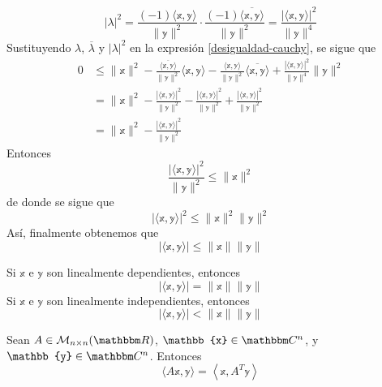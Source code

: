 \begin{theorem}
    $$|\lambda|^2 = \frac{(-1)\langle \mathbb{x}, \mathbb{y} \rangle}{\| \mathbb{y} \|^2} \cdot \frac{(-1)\overline{\langle \mathbb{x}, \mathbb{y} \rangle}}{\| \mathbb{y} \|^2} = \frac{|\langle \mathbb{x}, \mathbb{y} \rangle|^2}{\| \mathbb{y} \|^4}$$
    Sustituyendo $\lambda$, $\overline{\lambda}$ y $|\lambda|^2$ en la expresión \eqref{desigualdad-cauchy}, se sigue que
    \begin{align*}
        0 & \leq \| \mathbb{x} \|^2 - \frac{\overline{\langle \mathbb{x}, \mathbb{y} \rangle}}{\| \mathbb{y} \|^2} \langle \mathbb{x}, \mathbb{y} \rangle - \frac{\langle \mathbb{x}, \mathbb{y} \rangle}{\| \mathbb{y} \|^2} \overline{\langle \mathbb{x}, \mathbb{y} \rangle} + \frac{|\langle \mathbb{x}, \mathbb{y} \rangle|^2}{\| \mathbb{y} \|^4} \| \mathbb{y} \|^2 \\
        & = \| \mathbb{x} \|^2 - \frac{|\langle \mathbb{x}, \mathbb{y} \rangle|^2}{\| \mathbb{y} \|^2} - \frac{|\langle \mathbb{x}, \mathbb{y} \rangle|^2}{\| \mathbb{y} \|^2} + \frac{|\langle \mathbb{x}, \mathbb{y} \rangle|^2}{\| \mathbb{y} \|^2} \\
        & = \| \mathbb{x} \|^2 - \frac{|\langle \mathbb{x}, \mathbb{y} \rangle|^2}{\| \mathbb{y} \|^2}
    \end{align*}
    Entonces
    $$\frac{|\langle \mathbb{x}, \mathbb{y} \rangle|^2}{\| \mathbb{y} \|^2} \leq \| \mathbb{x} \|^2$$
    de donde se sigue que
    $$|\langle \mathbb{x}, \mathbb{y} \rangle|^2 \leq \| \mathbb{x} \|^2 \| \mathbb{y} \|^2$$
    Así, finalmente obtenemos que
    $$|\langle \mathbb{x}, \mathbb{y} \rangle| \leq \| \mathbb{x} \| \| \mathbb{y} \|$$
\end{theorem}

\begin{observation}
    Si $\mathbb{x}$ e $\mathbb{y}$ son linealmente dependientes, entonces
    $$|\langle \mathbb{x}, \mathbb{y} \rangle| = \| \mathbb{x} \| \| \mathbb{y} \|$$
    Si $\mathbb{x}$ e $\mathbb{y}$ son linealmente independientes, entonces
    $$|\langle \mathbb{x}, \mathbb{y} \rangle| < \| \mathbb{x} \| \| \mathbb{y} \|$$
\end{observation}

\begin{theorem}\label{JAJSJSJSJJSJSHSTTYQUUQHIAIIQVVCGTQYHHAHAHA}
    Sean $A \in \mathcal{M}_{n \times n}(\RR)$, $\mathbb{x} \in \CC[n]$, y $\mathbb{y} \in \CC[n]$. Entonces
    $$\langle A\mathbb{x}, \mathbb{y} \rangle = \left\langle \mathbb{x}, A^T\mathbb{y} \right\rangle$$
\end{theorem}

